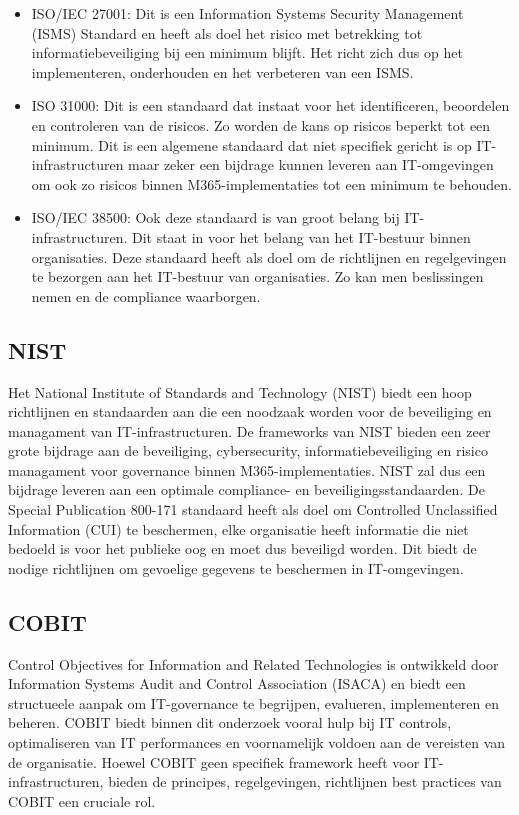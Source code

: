 \begin{itemize}
  \item ISO/IEC 27001:
  Dit is een Information Systems Security Management (ISMS) Standard en heeft als doel het risico met betrekking tot informatiebeveiliging bij een minimum blijft. Het richt zich dus op het implementeren, onderhouden en het verbeteren van een ISMS.
  \item ISO 31000:
  Dit is een standaard dat instaat voor het identificeren, beoordelen en controleren van de risicos. Zo worden de kans op risicos beperkt tot een minimum.
  Dit is een algemene standaard dat niet specifiek gericht is op IT-infrastructuren maar zeker een bijdrage kunnen leveren aan IT-omgevingen om ook zo risicos binnen M365-implementaties tot een minimum te behouden.
  \item ISO/IEC 38500:
  Ook deze standaard is van groot belang bij IT-infrastructuren. Dit staat in voor het belang van het IT-bestuur binnen organisaties. Deze standaard heeft als doel om de richtlijnen en regelgevingen te bezorgen aan het IT-bestuur van organisaties. Zo kan men beslissingen nemen en de compliance waarborgen.

\end{itemize}

\subsection{NIST}
Het National Institute of Standards and Technology (NIST) biedt een hoop richtlijnen en standaarden aan die een noodzaak worden voor de beveiliging en managament van IT-infrastructuren. De frameworks van NIST bieden een zeer grote bijdrage aan de beveiliging, cybersecurity, informatiebeveiliging en risico managament voor governance binnen M365-implementaties.
NIST zal dus een bijdrage leveren aan een optimale compliance- en beveiligingsstandaarden.
De Special Publication 800-171 standaard heeft als doel om Controlled Unclassified Information (CUI) te beschermen, elke organisatie heeft informatie die niet bedoeld is voor het publieke oog en moet dus beveiligd worden. Dit biedt de nodige richtlijnen om gevoelige gegevens te beschermen in IT-omgevingen.

\subsection{COBIT}
Control Objectives for Information and Related Technologies is ontwikkeld door Information Systems Audit and Control Association (ISACA) en biedt een structueele aanpak om IT-governance te begrijpen, evalueren, implementeren en beheren. COBIT biedt binnen dit onderzoek vooral hulp bij IT controls, optimaliseren van IT performances en voornamelijk voldoen aan de vereisten van de organisatie.
Hoewel COBIT geen specifiek framework heeft voor IT-infrastructuren, bieden de principes, regelgevingen, richtlijnen best practices van COBIT een cruciale rol. 

